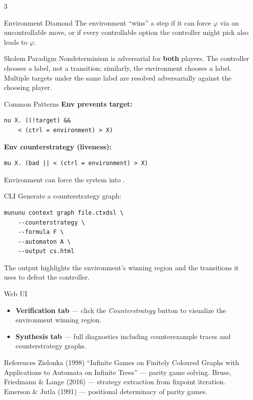 \begin{multicols}{3}
\begin{cheatbox}{Environment Diamond}
\smallskip
The environment ``wins'' a step if it can force $\varphi$ via an uncontrollable move, or if every controllable option the controller might pick also leads to $\varphi$.
\end{cheatbox}

\begin{tipbox}{Skolem Paradigm}
Nondeterminism is adversarial for \textbf{both} players.  The controller chooses a label, not a transition; similarly, the environment chooses a label.  Multiple targets under the same label are resolved adversarially against the choosing player.
\end{tipbox}

\begin{cheatbox}{Common Patterns}
\textbf{Env prevents target:}
\begin{lstlisting}[style=ctxdsl]
nu X. ((!target) &&
    < (ctrl = environment) > X)
\end{lstlisting}

\textbf{Env counterstrategy (liveness):}
\begin{lstlisting}[style=ctxdsl]
mu X. (bad || < (ctrl = environment) > X)
\end{lstlisting}
Environment can force the system into .
\end{cheatbox}

\columnbreak


\begin{cheatbox}{CLI}
Generate a counterstrategy graph:
\begin{lstlisting}[style=shell]
mununu context graph file.ctxdsl \
    --counterstrategy \
    --formula F \
    --automaton A \
    --output cs.html
\end{lstlisting}
The output highlights the environment's winning region and the transitions it uses to defeat the controller.
\end{cheatbox}

\begin{cheatbox}{Web UI}
\begin{itemize}
  \item \textbf{Verification tab} --- click the \emph{Counterstrategy} button to visualize the environment winning region.
  \item \textbf{Synthesis tab} --- full diagnostics including counterexample traces and counterstrategy graphs.
\end{itemize}
\end{cheatbox}

\begin{tipbox}{References}
Zielonka (1998) ``Infinite Games on Finitely Coloured Graphs with Applications to Automata on Infinite Trees'' --- parity game solving.
Bruse, Friedmann \& Lange (2016) --- strategy extraction from fixpoint iteration.
Emerson \& Jutla (1991) --- positional determinacy of parity games.
\end{tipbox}

\end{multicols}

